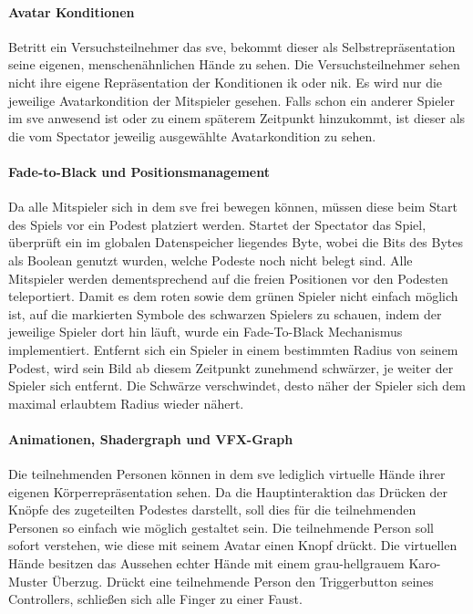 \documentclass[a4paper,11pt]{article}%
\renewcommand{\\}{\vspace*{0.5\baselineskip} \newline}
\begin{document}
\paragraph{Avatar Konditionen}
Betritt ein Versuchsteilnehmer das \ac{sve}, bekommt dieser als Selbstrepräsentation seine eigenen, menschenähnlichen Hände zu sehen. Die Versuchsteilnehmer sehen nicht ihre eigene Repräsentation der Konditionen \ac{ik} oder \ac{nik}. Es wird nur die jeweilige Avatarkondition der Mitspieler gesehen.
Falls schon ein anderer Spieler im \ac{sve} anwesend ist oder zu einem späterem Zeitpunkt hinzukommt, ist dieser als die vom Spectator jeweilig ausgewählte Avatarkondition zu sehen. 

\paragraph{Fade-to-Black und Positionsmanagement}
	Da alle Mitspieler sich in dem \ac{sve} frei bewegen können, müssen diese beim Start des Spiels vor ein Podest platziert werden. Startet der Spectator das Spiel, überprüft ein im globalen Datenspeicher liegendes Byte, wobei die Bits des Bytes als Boolean genutzt wurden, welche Podeste noch nicht belegt sind. Alle Mitspieler werden dementsprechend auf die freien Positionen vor den Podesten teleportiert.
Damit es dem roten sowie dem grünen Spieler nicht einfach möglich ist, auf die markierten Symbole des schwarzen Spielers zu schauen, indem der jeweilige Spieler dort hin läuft, wurde ein Fade-To-Black Mechanismus implementiert. Entfernt sich ein Spieler in einem bestimmten Radius von seinem Podest, wird sein Bild ab diesem Zeitpunkt zunehmend schwärzer, je weiter der Spieler sich entfernt. Die Schwärze verschwindet, desto näher der Spieler sich dem maximal erlaubtem Radius wieder nähert.

\paragraph{Animationen, Shadergraph und VFX-Graph}
Die teilnehmenden Personen können in dem \ac{sve} lediglich virtuelle Hände ihrer eigenen Körperrepräsentation sehen. Da die Hauptinteraktion das Drücken der Knöpfe des zugeteilten Podestes darstellt, soll dies für die teilnehmenden Personen so einfach wie möglich gestaltet sein. Die teilnehmende Person soll sofort verstehen, wie diese mit seinem Avatar einen Knopf drückt. Die virtuellen Hände besitzen das Aussehen echter Hände mit einem grau-hellgrauem Karo-Muster Überzug. Drückt eine teilnehmende Person den Triggerbutton seines Controllers, schließen sich alle Finger zu einer Faust.
\end{document}
